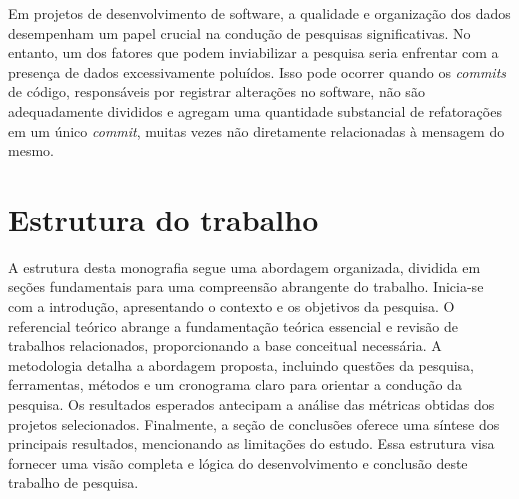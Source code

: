 Em projetos de desenvolvimento de software, a qualidade e organização dos dados desempenham um papel crucial na condução de pesquisas significativas. No entanto, um dos fatores que podem inviabilizar a pesquisa seria enfrentar com a presença de dados excessivamente poluídos. Isso pode ocorrer quando os \textit{commits} de código, responsáveis por registrar alterações no software, não são adequadamente divididos e agregam uma quantidade substancial de refatorações em um único \textit{commit}, muitas vezes não diretamente relacionadas à mensagem do mesmo.

\section{Estrutura do trabalho}
\label{sec:estruturaTrabalho}

A estrutura desta monografia segue uma abordagem organizada, dividida em seções fundamentais para uma compreensão abrangente do trabalho. Inicia-se com a introdução, apresentando o contexto e os objetivos da pesquisa. O referencial teórico abrange a fundamentação teórica essencial e revisão de trabalhos relacionados, proporcionando a base conceitual necessária. A metodologia detalha a abordagem proposta, incluindo questões da pesquisa, ferramentas, métodos e um cronograma claro para orientar a condução da pesquisa. Os resultados esperados antecipam a análise das métricas obtidas dos projetos selecionados. Finalmente, a seção de conclusões oferece uma síntese dos principais resultados, mencionando as limitações do estudo. Essa estrutura visa fornecer uma visão completa e lógica do desenvolvimento e conclusão deste trabalho de pesquisa.
